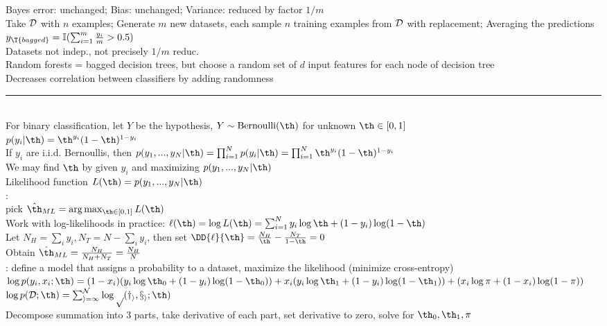 \documentclass[10pt]{CheatSheet/hw}
\begin{document}
\begin{multicols*}{5}
Bayes error: unchanged; Bias: unchanged; Variance: reduced by factor $1/m$\\
Take $\cal{D}$ with $n$ examples; Generate $m$ new datasets, each sample $n$ training examples from $\cal{D}$ with replacement; Averaging the predictions\\
$y_{\T{bagged}}=\mathbb{I}(\sum_{i=1}^m \frac{y_i}{m}>0.5)$\\
Datasets not indep., not precisely $1/m$ reduc.\\
Random forests = bagged decision trees, but choose a random set of $d$ input features for each node of decision tree\\
Decreases correlation between classifiers by adding randomness 
\rule{\linewidth}{0.4pt}
\\
For binary classification, let $Y$ be the hypothesis, $Y\sim\operatorname{Bernoulli}(\th)$ for unknown $\th\in[0,1]$\\
$p(y_i|\th)=\th^{y_i}(1-\th)^{1-y_i}$\\
If $y_i$ are i.i.d. Bernoullis, then $p(y_1,...,y_N|\th)=\textstyle\prod_{i=1}^N p(y_i|\th)=\textstyle\prod_{i=1}^N \th^{y_i}(1-\th)^{1-y_i}$\\
We may find $\th$ by given $y_i$ and maximizing $p(y_1,...,y_N|\th)$ \\
Likelihood function $L(\th)=p(y_1,...,y_N|\th)$\\
: \\
pick $\hat{\th}_{ML}=\arg\max_{\th\in[0,1]} L(\th)$\\
Work with log-likelihoods in practice: $\ell(\th)=\log L(\th)=\sum_{i=1}^N y_i\log\th+(1-y_i)\log(1-\th)$\\
Let $N_H=\sum_i y_i, N_T=N-\sum_i y_i$, then set $\DD{\ell}{\th}=\frac{N_H}{\th}-\frac{N_T}{1-\th}=0$\\
Obtain $\hat{\th}_{ML}=\frac{N_H}{N_H+N_T}=\frac{N_H}{N}$\\
: define a model that assigns a probability to a dataset, maximize the likelihood (minimize cross-entropy)\\
$\log p(y_i,x_i;\th)=(1-x_i)(y_i\log \th_0+(1-y_i)\log(1-\th_0))+x_i(y_i\log \th_1+(1-y_i)\log(1-\th_1))+(x_i\log \pi + (1-x_i)\log(1-\pi))$\\
$\log p(\cal{D};\th)=\sum_{i=1}^N \log p(y_i,x_i;\th)$\\
Decompose summation into 3 parts, take derivative of each part, set derivative to zero, solve for $\th_0,\th_1,\pi$\\

\end{multicols*}
\end{document}
